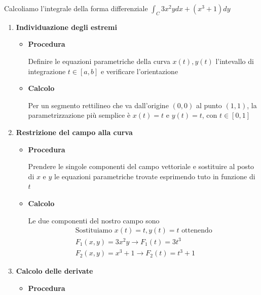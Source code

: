 \vspace{\baselineskip}

Calcoliamo l'integrale della forma differenziale $\int_
{C}3x^2y dx + (x^3+1)dy$
\newpage
\begin{enumerate}
        \item \textbf{Individuazione degli estremi}

            \begin{itemize}
                \item \textbf{Procedura}

                Definire le equazioni parametriche della curva $x(t),y(t)$ l'intevallo di integrazione $t \in [a,b]$ e verificare l'orientazione
                
                \item \textbf{Calcolo}

                Per un segmento rettilineo che va dall'origine $(0,0)$ al punto $(1,1)$, la parametrizzazione più semplice è $x(t)=t$ e $y(t)=t$, con $t\in[0,1]$
            \end{itemize}

        \item \textbf{Restrizione del campo alla curva}

            \begin{itemize}
                \item \textbf{Procedura}

                Prendere le singole componenti del campo vettoriale e sostituire al posto di $x$ e $y$ le equazioni parametriche trovate esprimendo tuto in funzione di $t$

                \item \textbf{Calcolo}
                
                Le due componenti del nostro campo sono 
                    \begin{gather}
                        \text{Sostituiamo } x(t)=t,y(t)=t \text{ ottenendo} \\
                        F_{1}(x,y)=3x^2y \to F_{1}(t)=3t^3\\
                        F_{2}(x,y)=x^3+1 \to F_{2}(t)=t^3+1
                    \end{gather}
            \end{itemize}

        \item \textbf{Calcolo delle derivate}
            \begin{itemize}
                \item \textbf{Procedura}


\end{itemize}
\end{enumerate}
